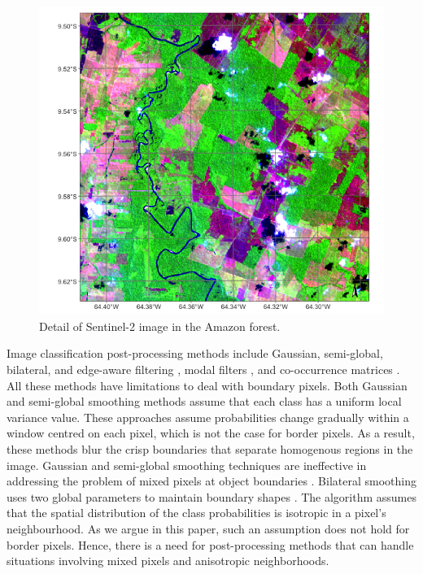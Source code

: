 \documentclass[
  shortnames]{jss}
\begin{document}
\begin{CodeChunk}
\begin{figure}[h]

{\centering \includegraphics[width=0.8\linewidth]{images/rgb_image} 

}

\caption[Detail of Sentinel-2 image in the Amazon forest]{Detail of Sentinel-2 image in the Amazon forest.}\label{fig:roim}
\end{figure}
\end{CodeChunk}

Image classification post-processing methods include Gaussian, semi-global, bilateral, and edge-aware filtering \citep{Schindler2012}, modal filters \citep{Ghimire2010}, and co-occurrence matrices \citep{Huang2014}. All these methods have limitations to deal with boundary pixels. Both Gaussian and semi-global smoothing methods assume that each class has a uniform local variance value. These approaches assume probabilities change gradually within a window centred on each pixel, which is not the case for border pixels. As a result, these methods blur the crisp boundaries that separate homogenous regions in the image. Gaussian and semi-global smoothing techniques are ineffective in addressing the problem of mixed pixels at object boundaries \citep{Huang2014}. Bilateral smoothing uses two global parameters to maintain boundary shapes \citep{Schindler2012}. The algorithm assumes that the spatial distribution of the class probabilities is isotropic in a pixel's neighbourhood. As we argue in this paper, such an assumption does not hold for border pixels. Hence, there is a need for post-processing methods that can handle situations involving mixed pixels and anisotropic neighborhoods.
\end{document}

